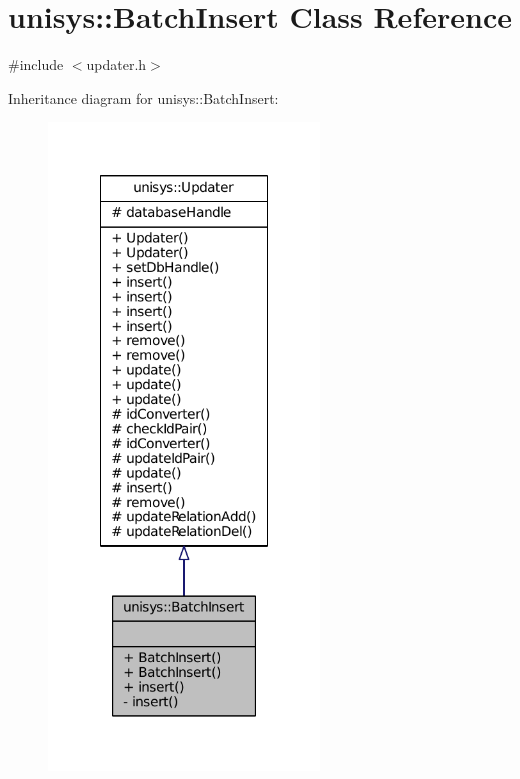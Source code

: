 \hypertarget{classunisys_1_1BatchInsert}{\section{unisys\-:\-:Batch\-Insert Class Reference}
\label{classunisys_1_1BatchInsert}
}


{\ttfamily \#include $<$updater.\-h$>$}



Inheritance diagram for unisys\-:\-:Batch\-Insert\-:
\nopagebreak
\begin{figure}[H]
\begin{center}
\leavevmode
\includegraphics[width=204pt]{classunisys_1_1BatchInsert__inherit__graph}
\end{center}
\end{figure}


